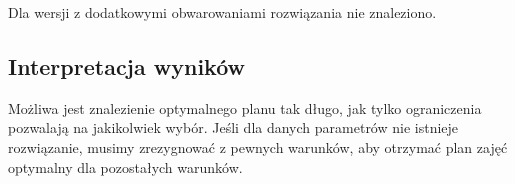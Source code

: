 \documentclass[polish,12pt,titlepage]{article}
\begin{document}
Dla wersji z dodatkowymi obwarowaniami rozwiązania nie znaleziono.

\subsection{Interpretacja wyników}

Możliwa jest znalezienie optymalnego planu tak długo, jak tylko ograniczenia pozwalają na jakikolwiek wybór. Jeśli dla danych parametrów nie istnieje rozwiązanie, musimy zrezygnować z pewnych warunków, aby otrzymać plan zajęć optymalny dla pozostałych warunków.
\end{document}

